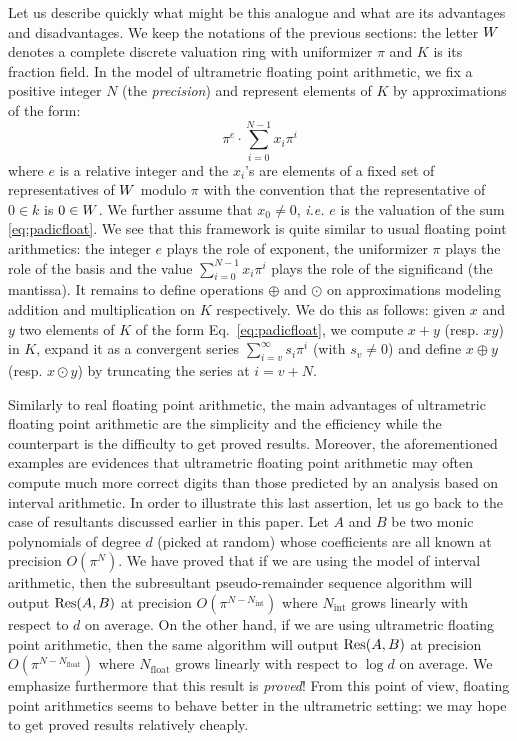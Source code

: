 \documentclass{article}
\begin{document}
Let us describe quickly what might be this analogue and what are its
advantages and disadvantages. We keep the notations of the previous
sections: the letter $W$ denotes a complete discrete valuation ring
with uniformizer $\pi$ and $K$ is its fraction field.
In the model of ultrametric floating point arithmetic, we fix a
positive integer $N$ (the \emph{precision}) and represent elements 
of $K$ by approximations of the form:
\begin{equation}
\label{eq:padicfloat}
\pi^e \cdot \sum_{i=0}^{N-1} x_i \pi^i
\end{equation}
where $e$ is a relative integer and the $x_i$'s are elements of a fixed 
set of representatives of $W$ modulo $\pi$ with the convention that the 
representative of $0 \in k$ is $0 \in W$.
We further assume that $x_0 \neq 0$, \emph{i.e.} $e$ is the valuation
of the sum \eqref{eq:padicfloat}. We see that this framework is quite
similar to usual floating point arithmetics: the integer $e$ plays the
role of exponent, the uniformizer $\pi$ plays the role of the basis
and the value $\sum_{i=0}^{N-1} x_i \pi^i$ plays the role of the
significand (the mantissa). It remains to define operations $\oplus$
and $\odot$ on approximations modeling addition and multiplication
on $K$ respectively. We do this as follows: given $x$ and $y$ two
elements of $K$ of the form Eq.~\eqref{eq:padicfloat}, we compute
$x+y$ (resp. $xy$) in $K$, expand it as a convergent series 
$\sum_{i=v}^{\infty} s_i \pi^i$ (with $s_v \neq 0$) and define $x 
\oplus y$ (resp. $x \odot y$) by truncating the series at $i = v+N$.

Similarly to real floating point arithmetic, the main advantages of 
ultrametric floating point arithmetic are the simplicity and the 
efficiency while the counterpart is the difficulty to get proved results. 
Moreover, the aforementioned examples are evidences that ultrametric 
floating point arithmetic may often compute much more correct digits 
than those predicted by an analysis based on interval arithmetic. In 
order to illustrate this last assertion, let us go back to the case of 
resultants discussed earlier in this paper. Let $A$ and $B$ be two monic 
polynomials of degree $d$ (picked at random) whose coefficients are all 
known at precision $O(\pi^N)$. We have proved that if we are using the
model of interval arithmetic, then the subresultant pseudo-remainder
sequence algorithm will output $\text{\rm Res}(A,B)$ at precision 
$O(\pi^{N-N_{\text{int}}})$ where $N_{\text{int}}$ grows linearly 
with respect to $d$ on average. On the other hand, if we are using 
ultrametric floating point arithmetic, then the same algorithm will
output $\text{\rm Res}(A,B)$ at precision $O(\pi^{N-N_{\text{float}}})$ where 
$N_{\text{float}}$ grows linearly with respect to $\log d$ on average.
We emphasize furthermore that this result is \emph{proved}! From this
point of view, floating point arithmetics seems to behave better in
the ultrametric setting: we may hope to get proved results relatively
cheaply.
\end{document}
